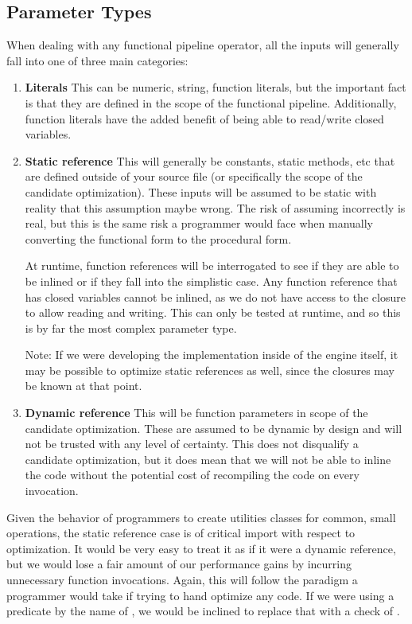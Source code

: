 \subsection{Parameter Types}
When dealing with any functional pipeline operator, all the inputs will generally fall into one of three main categories:

\begin{enumerate}
  \item \textbf{Literals}
    This can be numeric, string, function literals, but the important fact is that they are defined in the scope of the functional pipeline.  Additionally, function literals have the added benefit of being able to read/write closed variables.

  \item \textbf{Static reference}
    This will generally be constants, static methods, etc that are defined outside of your source file (or specifically the scope of the candidate optimization).  These inputs will be assumed to be static with reality that this assumption maybe wrong.  The risk of assuming incorrectly is real, but this is the same risk a programmer would face when manually converting the functional form to the procedural form.  
    
    At runtime, function references will be interrogated to see if they are able to be inlined or if they fall into the simplistic case.  Any function reference that has closed variables cannot be inlined, as we do not have access to the closure to allow reading and writing.  This can only be tested at runtime, and so this is by far the most complex parameter type.  
    
    Note: If we were developing the implementation inside of the \javascript engine itself, it may be possible to optimize static references as well, since the closures may be known at that point.

  \item \textbf{Dynamic reference}
    This will be function parameters in scope of the candidate optimization. These are assumed to be dynamic by design and will not be trusted with any level of certainty.  This does not disqualify a candidate optimization, but it does mean that we will not be able to inline the code without the potential cost of recompiling the code on every invocation.
\end{enumerate}

Given the behavior of programmers to create utilities classes for common, small operations, the static reference case is of critical import with respect to optimization.  It would be very easy to treat it as if it were a dynamic reference, but we would lose a fair amount of our performance gains by incurring unnecessary function invocations.  Again, this will follow the paradigm a programmer would take if trying to hand optimize any code.  If we were using a predicate by the name of , we would be inclined to replace that with a check of . 